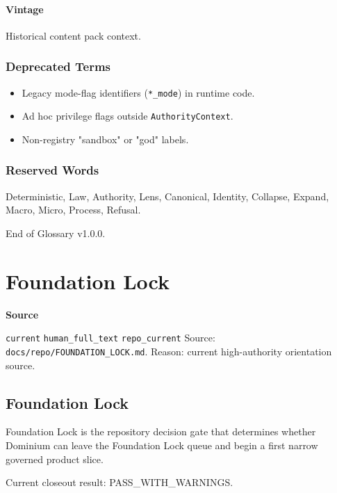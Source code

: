 \documentclass[9pt,a4paper,openany]{book}
\newcommand{\vonecallout}[3]{\par\medskip\noindent\begingroup\setlength{\fboxsep}{7pt}\colorbox{DomCalloutBg}{\parbox{0.94\linewidth}{\textbf{\textcolor{#1}{#2}}\par #3}}\endgroup\par\medskip}
\begin{document}
\paragraph{Vintage}
Historical content pack context.\allowbreak{}


\subsubsection{Deprecated Terms}
\begin{itemize}
\item Legacy mode-\allowbreak{}flag identifiers (\texttt{*\_\allowbreak{}mode}) in runtime code.\allowbreak{}
\item Ad hoc privilege flags outside \texttt{AuthorityContext}.\allowbreak{}
\item Non-\allowbreak{}registry "sandbox" or "god" labels.\allowbreak{}
\end{itemize}

\subsubsection{Reserved Words}
Deterministic, Law, Authority, Lens, Canonical, Identity, Collapse, Expand, Macro, Micro, Process, Refusal.\allowbreak{}


End of Glossary v1.\allowbreak{}0.\allowbreak{}0.\allowbreak{}




\section{Foundation Lock}

\vonecallout{DomSlate}{Source}{\texttt{current} \texttt{human\_\allowbreak{}full\_\allowbreak{}text} \texttt{repo\_\allowbreak{}current} Source: \texttt{docs/\allowbreak{}repo/\allowbreak{}FOUNDATION\_\allowbreak{}LOCK.\allowbreak{}md}.\allowbreak{} Reason: current high-\allowbreak{}authority orientation source.\allowbreak{}}

\subsection{Foundation Lock}

Foundation Lock is the repository decision gate that determines whether Dominium can leave the Foundation Lock queue and begin a first narrow governed product slice.\allowbreak{}


Current closeout result: PASS\_\allowbreak{}WITH\_\allowbreak{}WARNINGS.\allowbreak{}
\end{document}
